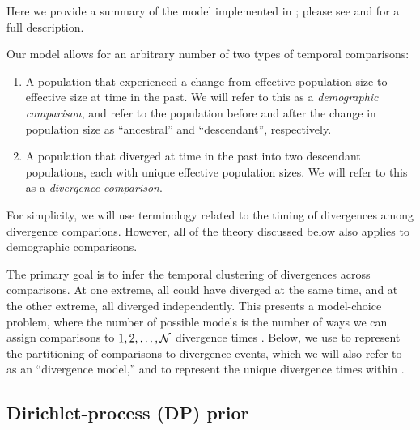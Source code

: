 Here we provide a summary of the model implemented in \ecoevolity; please see
\citet{Oaks2018ecoevolity} and \citet{Oaks2019codemog} for a full description.

Our model allows for an arbitrary number of two types of temporal comparisons:
\begin{enumerate}
    \item A population that experienced a change from effective population size
        \epopsize[\rootpopindex]
        to effective size
        \epopsize[\descendantpopindex{}]
        at time \comparisonetime in the past.
        We will refer to this as a \emph{demographic comparison},
        and refer to the population before and after the change in population
        size as ``ancestral'' and ``descendant'', respectively.
    \item A population that diverged at time \comparisonetime in the past into
        two descendant populations, each with unique effective population
        sizes.
        We will refer to this as a \emph{divergence comparison}.
\end{enumerate}
For simplicity, we will use terminology related to the timing of divergences
among divergence comparions.
However, all of the theory discussed below also applies to demographic
comparisons.

The primary goal is to infer the temporal clustering of divergences across
\ncomparisons comparisons.
At one extreme, all \ncomparisons could have diverged at the same time,
and at the other extreme, all \ncomparisons diverged independently.
This presents a model-choice problem, where the number of possible models
is the number of ways we can assign \ncomparisons comparisons to
$1, 2,  \ldots, \mathcal{N}$ divergence times
\citep[the Bell number;][]{Bell1934}.
Below, we use \etimesets to represent the partitioning of comparisons to
divergence events, which we will also refer to as an ``divergence model,'' and
\etimes to represent the unique divergence times within \etimesets.

\subsection{Dirichlet-process (DP) prior}

